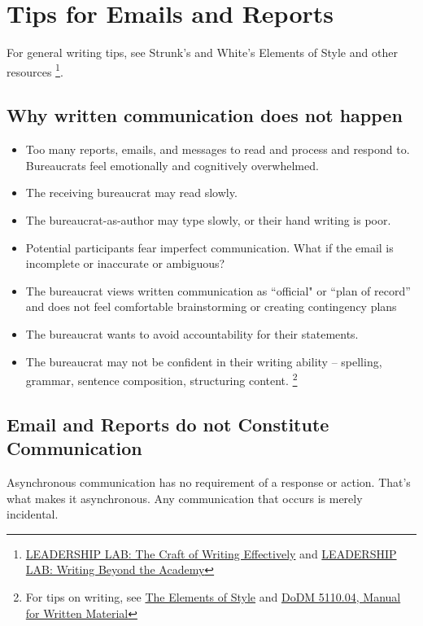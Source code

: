 \section{Tips for Emails and Reports}



For general writing tips, see Strunk's and White's Elements of Style and other resources \footnote{\href{https://www.youtube.com/watch?v=vtIzMaLkCaM}{LEADERSHIP LAB: The Craft of Writing Effectively} and \href{https://www.youtube.com/watch?v=aFwVf5a3pZM}{LEADERSHIP LAB: Writing Beyond the Academy}}.



\subsection*{Why written communication does not happen\label{sec:written-comm-does-not-happen}}
\begin{itemize}
    \item Too many reports, emails, and messages to read and process and respond to. Bureaucrats feel emotionally and cognitively overwhelmed.
\item The receiving bureaucrat may read slowly.
\item The bureaucrat-as-author may type slowly, or their hand writing is poor.
\item Potential participants fear imperfect communication. What if the email is incomplete or inaccurate or ambiguous?
\item The bureaucrat views written communication as ``official" or ``plan of record'' and does not feel comfortable brainstorming or creating contingency plans
\item The bureaucrat wants to avoid accountability for their statements.
\item The bureaucrat may not be confident in their writing ability -- spelling, grammar, sentence composition, structuring content. \footnote{For tips on writing, see 
\href{https://en.wikipedia.org/wiki/The_Elements_of_Style}{The Elements of Style}
and
\href{https://www.google.com/search?q=dodm+5110.04}{DoDM 5110.04, Manual for Written Material}}
\end{itemize}





\subsection*{Email and Reports do not Constitute Communication}
Asynchronous communication has no requirement of a response or action. That's what makes it asynchronous. Any communication that occurs is merely incidental.

